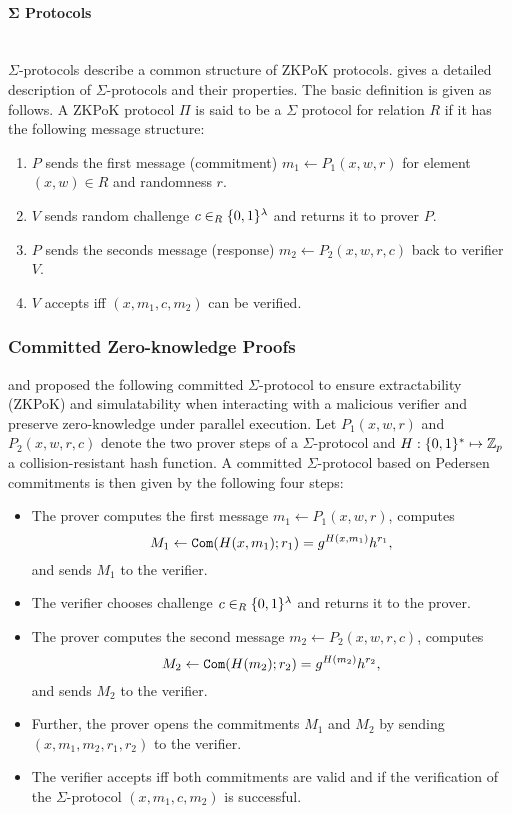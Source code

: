 \paragraph{$\bm{\Sigma}$ Protocols}\hfill\\
$\Sigma$-protocols describe a common structure of \ac{ZKPoK} protocols.
\citet{Damgard10} gives a detailed description of $\Sigma$-protocols and their properties.
The basic definition is given as follows.
A \ac{ZKPoK} protocol $\Pi$ is said to be a $\Sigma$ protocol for relation $R$ if it has the following message structure:
\begin{enumerate}
  \item $P$ sends the first message (commitment) $m_1\gets P_1(x,w,r)$ for element $(x,w)\in R$ and randomness $r$.
  \item $V$ sends random challenge $c\in_R\{0,1\}^\lambda$ and returns it to prover $P$.
  \item $P$ sends the seconds message (response) $m_2\gets P_2(x,w,r,c)$ back to verifier $V$.
  \item $V$ accepts iff $(x,m_1,c,m_2)$ can be verified.
\end{enumerate}


\subsubsection{Committed Zero-knowledge Proofs}
\citet{Damgard00} and \citet{JareckiL00} proposed the following committed $\Sigma$-protocol to ensure extractability (\ac{ZKPoK}) and simulatability when interacting with a malicious verifier and preserve zero-knowledge under parallel execution.
Let $P_1(x,w,r)$ and $P_2(x,w,r,c)$ denote the two prover steps of a $\Sigma$-protocol and $H:\{0,1\}^\ast\mapsto\mathbb{Z}_p$ a collision-resistant hash function.
A committed $\Sigma$-protocol based on Pedersen commitments is then given by the following four steps:
\begin{itemize}
  \item The prover computes the first message $m_1\gets P_1(x,w,r)$, computes 
  \[M_1\gets\mathtt{Com}(H(x,m_1); r_1)=g^{H(x,m_1)}h^{r_1},\]
  and sends $M_1$ to the verifier.
  \item The verifier chooses challenge $c\in_R\{0,1\}^\lambda$ and returns it to the prover.
  \item The prover computes the second message $m_2\gets P_2(x,w,r,c)$, computes 
  \[M_2\gets\mathtt{Com}(H(m_2); r_2)=g^{H(m_2)}h^{r_2},\]
   and sends $M_2$ to the verifier.
  \item Further, the prover opens the commitments $M_1$ and $M_2$ by sending $(x,m_1,m_2,r_1,r_2)$ to the verifier.
  \item The verifier accepts iff both commitments are valid and if the verification of the $\Sigma$-protocol $(x,m_1,c,m_2)$ is successful.
\end{itemize}

